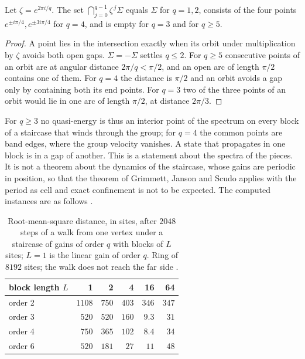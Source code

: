 \begin{proposition}\label{prop:local}
Let $\zeta=e^{2\pi i/q}$. The set $\bigcap_{j=0}^{q-1}\zeta^{\,j}\Sigma$ equals $\Sigma$ for $q=1,2$, consists of the four points $e^{\pm i\pi/4},e^{\pm3i\pi/4}$ for $q=4$, and is empty for $q=3$ and for $q\ge5$.
\end{proposition}
\begin{proof}
A point lies in the intersection exactly when its orbit under multiplication by $\zeta$ avoids both open gaps. $\Sigma=-\Sigma$ settles $q\le2$. For $q\ge5$ consecutive points of an orbit are at angular distance $2\pi/q<\pi/2$, and an open arc of length $\pi/2$ contains one of them. For $q=4$ the distance is $\pi/2$ and an orbit avoids a gap only by containing both its end points. For $q=3$ two of the three points of an orbit would lie in one arc of length $\pi/2$, at distance $2\pi/3$.
\end{proof}

For $q\ge3$ no quasi-energy is thus an interior point of the spectrum on every block of a staircase that winds through the group; for $q=4$ the common points are band edges, where the group velocity vanishes. A state that propagates in one block is in a gap of another. This is a statement about the spectra of the pieces. It is not a theorem about the dynamics of the staircase, whose gains are periodic in position, so that the theorem of Grimmett, Janson and Scudo \cite{gjs} applies with the period as cell and exact confinement is not to be expected. The computed instances are as follows \cite{comp4s}.

\begin{table}[ht]\centering\small
\begin{tabular}{@{}lrrrrr@{}}\toprule
block length $L$ & 1 & 2 & 4 & 16 & 64\\\midrule
order 2 & $1108$ & $750$ & $403$ & $346$ & $347$\\
order 3 & $520$ & $520$ & $160$ & $9.3$ & $31$\\
order 4 & $750$ & $365$ & $102$ & $8.4$ & $34$\\
order 6 & $520$ & $181$ & $27$ & $11$ & $48$\\\bottomrule
\end{tabular}
\caption{Root-mean-square distance, in sites, after $2048$ steps of a walk from one vertex under a staircase of gains of order $q$ with blocks of $L$ sites; $L=1$ is the linear gain of order $q$. Ring of $8192$ sites; the walk does not reach the far side \cite{comp4s}.}\label{tab:stair}
\end{table}

